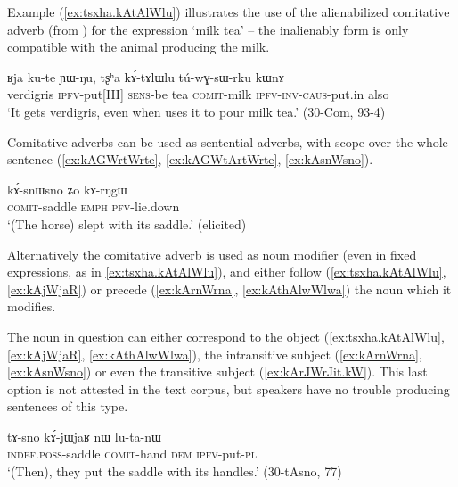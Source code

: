 Example (\ref{ex:tsxha.kAtAlWlu}) illustrates the use of the alienabilized comitative adverb  (from ) for the expression `milk tea' -- the inalienably form  is only compatible with the animal producing the milk.

\begin{exe}
\ex \label{ex:tsxha.kAtAlWlu}
\gll   ʁja ku-te ɲɯ-ŋu, tʂʰa kɤ́-tɤlɯ\redp{}lu tú-wɣ-sɯ-rku kɯnɤ \\
verdigris \textsc{ipfv}-put[III] \textsc{sens}-be tea \textsc{comit}-milk \textsc{ipfv}-\textsc{inv}-\textsc{caus}-put.in also \\
\glt  `It gets verdigris, even when uses it to pour milk tea.'  (30-Com, 93-4)
\end{exe}

Comitative adverbs can be used as sentential adverbs, with scope over the whole sentence (\ref{ex:kAGWrtWrte}, \ref{ex:kAGWtArtWrte}, \ref{ex:kAsnWsno}). 

\begin{exe}
\ex \label{ex:kAsnWsno}
\gll kɤ́-snɯ\tld{}sno 	ʑo 	kɤ-rŋgɯ \\
\textsc{comit}-saddle \textsc{emph} \textsc{pfv}-lie.down \\
\glt `(The horse) slept with its saddle.' (elicited)
\end{exe}

Alternatively the comitative adverb is used as noun modifier (even in fixed expressions, as in \ref{ex:tsxha.kAtAlWlu}), and either follow (\ref{ex:tsxha.kAtAlWlu}, \ref{ex:kAjWjaR}) or precede (\ref{ex:kArnWrna}, \ref{ex:kAthAlwWlwa}) the noun which it modifies.

The noun in question can either correspond to the object (\ref{ex:tsxha.kAtAlWlu}, \ref{ex:kAjWjaR}, \ref{ex:kAthAlwWlwa}), the intransitive subject (\ref{ex:kArnWrna}, \ref{ex:kAsnWsno}) or even the transitive subject (\ref{ex:kArJWrJit.kW}). This last option is not attested in the text corpus, but speakers have no trouble producing sentences of this type.


\begin{exe}
\ex \label{ex:kAjWjaR}
\gll tɤ-sno 	kɤ́-jɯ\redp{}jaʁ 	nɯ 	lu-ta-nɯ \\
\textsc{indef.poss}-saddle \textsc{comit}-hand \textsc{dem} \textsc{ipfv}-put-\textsc{pl} \\
\glt `(Then), they put the saddle with its handles.' (30-tAsno, 77)
\end{exe}
 

